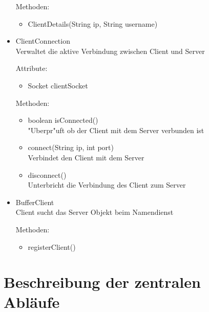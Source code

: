 \documentclass[a4paper,10pt]{article}
\begin{document}
\begin{itemize}
Methoden:
\begin{itemize}
\item ClientDetails(String ip, String username) 
\end{itemize}

\item ClientConnection \\
Verwaltet die aktive Verbindung zwischen Client und Server

Attribute:
\begin{itemize}
\item Socket clientSocket
\end{itemize}

Methoden:
\begin{itemize}
\item boolean isConnected()
\\"Uberpr"uft ob der Client mit dem Server verbunden ist
\item connect(String ip, int port)
\\Verbindet den Client mit dem Server
\item disconnect() 
\\Unterbricht die Verbindung des Client zum Server
\end{itemize}

\item BufferClient\\
Client sucht das Server Objekt beim Namendienst 

Methoden:
\begin{itemize}
\item registerClient() 
\end{itemize} %
\end{itemize} %

\section{Beschreibung der zentralen Abläufe}
\end{document}
